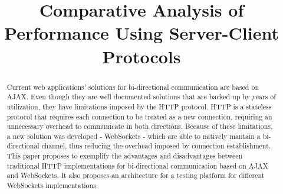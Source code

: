 \documentclass[conference]{IEEEtran}
\begin{document}
\title{Comparative Analysis of Performance Using Server-Client Protocols}

\author{
\and
{}
}

\maketitle

\begin{abstract}
Current web applications' solutions for bi-directional communication are based
on AJAX. Even though they are well documented solutions that are backed up by
years of utilization, they have limitations imposed by the HTTP protocol. HTTP
is a stateless protocol that requires each connection to be treated as a new
connection, requiring an unnecessary overhead to communicate in both directions.
Because of these limitations, a new solution was developed - WebSockets -
which are able to natively mantain a bi-directional channel, thus reducing the
overhead imposed by connection establishment.
\\
\indent
This paper proposes to exemplify the advantages and disadvantages between
traditional HTTP implementations for bi-directional communication based on AJAX
and WebSockets. It also proposes an architecture for a testing platform for
different WebSockets implementations.
\end{abstract}

\IEEEpeerreviewmaketitle

\end{document}
